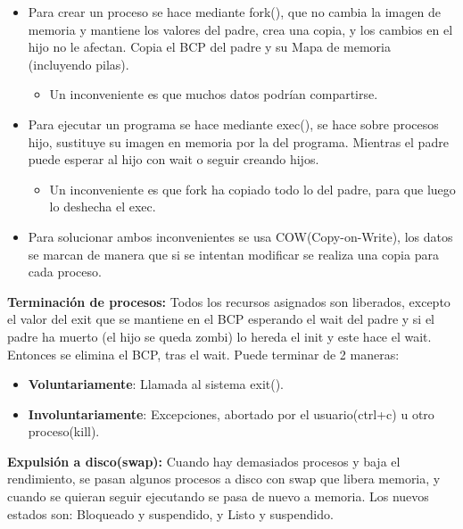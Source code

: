 \documentclass[12pt, twoside, openright]{report} %
\begin{document}
  \begin{itemize}
  \item Para crear un proceso se hace mediante fork(), que no cambia la
    imagen de memoria y mantiene los valores del padre, crea una copia,
    y los cambios en el hijo no le afectan. Copia el BCP del padre y su
    Mapa de memoria (incluyendo pilas).
    

    \begin{itemize}
    \item Un inconveniente es que muchos datos podrían compartirse.
      
    \end{itemize}
  \item Para ejecutar un programa se hace mediante exec(), se hace sobre
    procesos hijo, sustituye su imagen en memoria por la del programa.
    Mientras el padre puede esperar al hijo con wait o seguir creando
    hijos.
    

    \begin{itemize}
    \item Un inconveniente es que fork ha copiado todo lo del padre, para
      que luego lo deshecha el exec.
      
    \end{itemize}
  \item Para solucionar ambos inconvenientes se usa COW(Copy-on-Write), los
    datos se marcan de manera que si se intentan modificar se realiza
    una copia para cada proceso.
    
  \end{itemize}
\textbf{Terminación de procesos:} Todos los recursos asignados son
  liberados, excepto el valor del exit que se mantiene en el BCP
  esperando el wait del padre y si el padre ha muerto (el hijo se queda
  zombi) lo hereda el init y este hace el wait. Entonces se elimina el
  BCP, tras el wait. Puede terminar de 2 maneras:
  

  \begin{itemize}
  \item \textbf{Voluntariamente}: Llamada al sistema exit().
    
  \item \textbf{Involuntariamente}: Excepciones, abortado por el
    usuario(ctrl+c) u otro proceso(kill).
    
  \end{itemize}
\textbf{Expulsión a disco(swap):} Cuando hay demasiados procesos y
  baja el rendimiento, se pasan algunos procesos a disco con swap que
  libera memoria, y cuando se quieran seguir ejecutando se pasa de nuevo
  a memoria. Los nuevos estados son: Bloqueado y suspendido, y Listo y
  suspendido.
  
\end{document}
